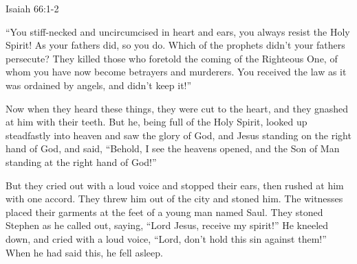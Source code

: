 {{Isaiah 66:1-2}
\par }{\PP {}“You stiff-necked and uncircumcised in heart and ears, you always resist the Holy Spirit! As your fathers did, so you do.
Which of the prophets didn’t your fathers persecute? They killed those who foretold the coming of the Righteous One, of whom you have now become betrayers and murderers.
You received the law as it was ordained by angels, and didn’t keep it!”
\par }{\PP {}Now when they heard these things, they were cut to the heart, and they gnashed at him with their teeth.
But he, being full of the Holy Spirit, looked up steadfastly into heaven and saw the glory of God, and Jesus standing on the right hand of God,
and said, “Behold, I see the heavens opened, and the Son of Man standing at the right hand of God!”
\par }{\PP {}But they cried out with a loud voice and stopped their ears, then rushed at him with one accord.
They threw him out of the city and stoned him. The witnesses placed their garments at the feet of a young man named Saul.
They stoned Stephen as he called out, saying, “Lord Jesus, receive my spirit!”
He kneeled down, and cried with a loud voice, “Lord, don’t hold this sin against them!” When he had said this, he fell asleep.

}
